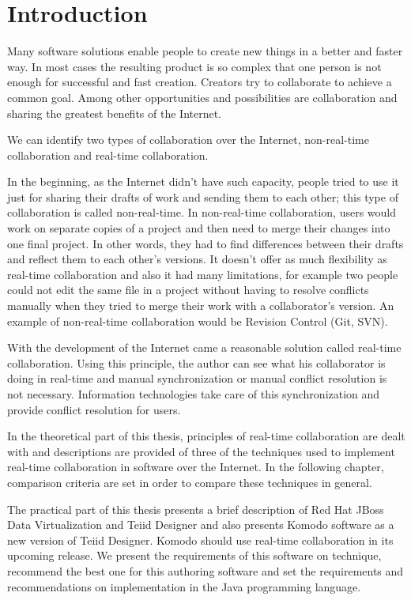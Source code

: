 \documentclass[12pt,oneside]{fithesis2}
\begin{document}
\chapter{Introduction} 
Many software solutions enable people to create new things in a better and faster way. In most cases the resulting product is so complex that one person is not enough for successful and fast creation. Creators try to collaborate to achieve a common goal. Among other opportunities and possibilities are collaboration and sharing the greatest benefits of the Internet. \par
We can identify two types of collaboration over the Internet, non-real-time collaboration and real-time collaboration. 
\par In the beginning, as the Internet didn't have such capacity, people tried to use it just for sharing their drafts of work and sending them to each other; this type of collaboration is called non-real-time. In non-real-time collaboration, users would work on separate copies of a project and then need to merge their changes into one final project. In other words, they had to find differences between their drafts and reflect them to each other's versions. It doesn't offer as much flexibility as real-time collaboration and also it had many limitations, for example two people could not edit the same file in a project without having to resolve conflicts manually when they tried to merge their work with a collaborator's version. An example of non-real-time collaboration would be Revision Control (Git, SVN).\par
With the development of the Internet came a reasonable solution called real-time collaboration. Using this principle, the author can see what his collaborator is doing in real-time and manual synchronization or manual conflict resolution is not necessary. Information technologies take care of this synchronization and provide conflict resolution for users.
\par In the theoretical part of this thesis, principles of real-time collaboration are dealt with and descriptions are provided of three of the techniques used to implement real-time collaboration in software over the Internet. In the following chapter, comparison criteria are set in order to compare these techniques in general. 
\par The practical part of this thesis presents a brief description of Red Hat JBoss Data Virtualization and Teiid Designer and also presents Komodo software as a new version of Teiid Designer. Komodo should use real-time collaboration in its upcoming release. We present the requirements of this software on technique, recommend the best one for this authoring software and set the requirements and recommendations on implementation in the Java programming language.
\end{document}
